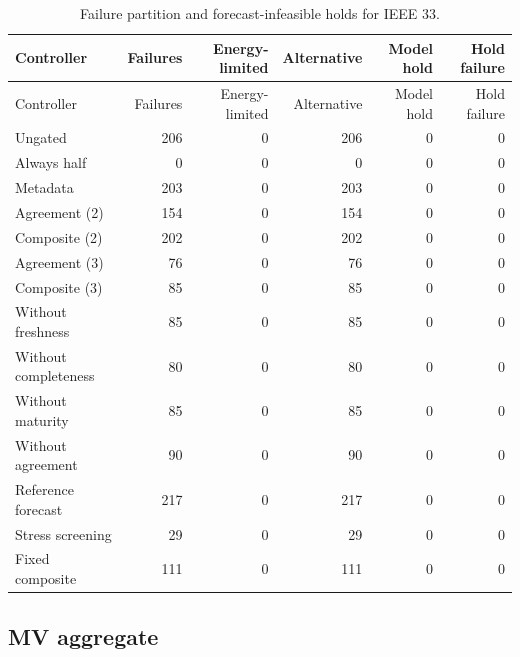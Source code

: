 \documentclass[11pt]{article}
\begin{document}
\small\begin{longtable}{lrrrrr}
\caption{Failure partition and forecast-infeasible holds for IEEE 33.}\\\toprule
Controller & Failures & Energy-limited & Alternative & Model hold & Hold failure\\\midrule
\endfirsthead
\toprule
Controller & Failures & Energy-limited & Alternative & Model hold & Hold failure\\\midrule
\endhead
\bottomrule\endfoot
Ungated & 206 & 0 & 206 & 0 & 0\\
Always half & 0 & 0 & 0 & 0 & 0\\
Metadata & 203 & 0 & 203 & 0 & 0\\
Agreement (2) & 154 & 0 & 154 & 0 & 0\\
Composite (2) & 202 & 0 & 202 & 0 & 0\\
Agreement (3) & 76 & 0 & 76 & 0 & 0\\
Composite (3) & 85 & 0 & 85 & 0 & 0\\
Without freshness & 85 & 0 & 85 & 0 & 0\\
Without completeness & 80 & 0 & 80 & 0 & 0\\
Without maturity & 85 & 0 & 85 & 0 & 0\\
Without agreement & 90 & 0 & 90 & 0 & 0\\
Reference forecast & 217 & 0 & 217 & 0 & 0\\
Stress screening & 29 & 0 & 29 & 0 & 0\\
Fixed composite & 111 & 0 & 111 & 0 & 0\\
\end{longtable}\normalsize
{}\subsection{MV aggregate}
\end{document}
